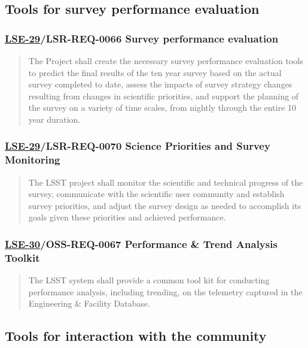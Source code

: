 \subsection{Tools for survey performance evaluation}
\label{sec:org53fc3e6}
\subsubsection{\href{https://ls.st/lse-29}{LSE-29}/LSR-REQ-0066 Survey performance evaluation}
\label{sec:org7a744ac}
\begin{quote}
The Project shall create the necessary survey performance evaluation
tools to predict the final results of the ten year survey based on the
actual survey completed to date, assess the impacts of survey strategy
changes resulting from changes in scientific priorities, and support
the planning of the survey on a variety of time scales, from nightly
through the entire 10 year duration.
\end{quote}
\subsubsection{\href{https://ls.st/lse-29}{LSE-29}/LSR-REQ-0070 Science Priorities and Survey Monitoring}
\label{sec:orge9968ea}
\begin{quote}
The LSST project shall monitor the scientific and technical progress
of the survey, communicate with the scientific user community and
establish survey priorities, and adjust the survey design as needed to
accomplish its goals given these priorities and achieved performance.
\end{quote}
\subsubsection{\href{https://ls.st/lse-30}{LSE-30}/OSS-REQ-0067 Performance \& Trend Analysis Toolkit}
\label{sec:orga7276ec}
\begin{quote}
The LSST system shall provide a common tool kit for conducting performance analysis, including trending, on the telemetry captured in the Engineering \& Facility Database.
\end{quote}
\subsection{Tools for interaction with the community}
\label{sec:org5d87304}
